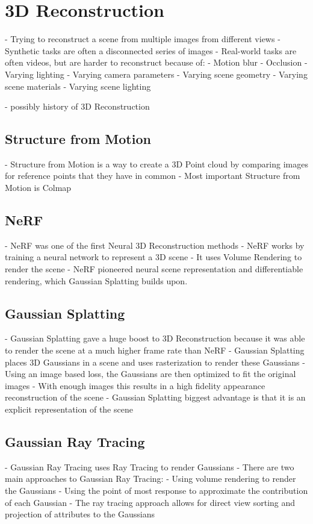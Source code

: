 \section{3D Reconstruction}

- Trying to reconstruct a scene from multiple images from different views
- Synthetic tasks are often a disconnected series of images
- Real-world tasks are often videos, but are harder to reconstruct because of:
    - Motion blur
    - Occlusion
    - Varying lighting
    - Varying camera parameters
    - Varying scene geometry
    - Varying scene materials
    - Varying scene lighting

- possibly history of 3D Reconstruction

\subsection{Structure from Motion}
- Structure from Motion is a way to create a 3D Point cloud by comparing images for reference points that they have in common
- Most important Structure from Motion is Colmap

\subsection{NeRF}
- NeRF was one of the first Neural 3D Reconstruction methods
- NeRF works by training a neural network to represent a 3D scene
- It uses Volume Rendering to render the scene
- NeRF pioneered neural scene representation and differentiable rendering, which Gaussian Splatting builds upon.

\subsection{Gaussian Splatting}
- Gaussian Splatting gave a huge boost to 3D Reconstruction because it was able to render the scene at a much higher frame rate than NeRF
- Gaussian Splatting places 3D Gaussians in a scene and uses rasterization to render these Gaussians
- Using an image based loss, the Gaussians are then optimized to fit the original images
- With enough images this results in a high fidelity appearance reconstruction of the scene
- Gaussian Splatting biggest advantage is that it is an explicit representation of the scene

\subsection{Gaussian Ray Tracing}
- Gaussian Ray Tracing uses Ray Tracing to render Gaussians
- There are two main approaches to Gaussian Ray Tracing:
    - Using volume rendering to render the Gaussians
    - Using the point of most response to approximate the contribution of each Gaussian
- The ray tracing approach allows for direct view sorting and projection of attributes to the Gaussians

